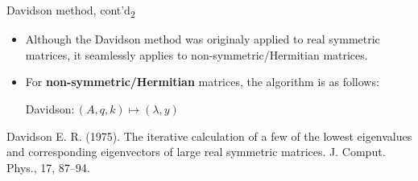 \documentclass[t,usepdftitle=false]{beamer}
\begin{document}
\begin{frame}{Davidson method, cont'd\textsubscript{2}}
\begin{itemize}
\item Although the Davidson method was originaly applied to real symmetric matrices, it seamlessly applies to non-symmetric/Hermitian matrices.
\item[] For \textbf{non-symmetric/Hermitian} matrices, the algorithm is as follows:\vspace{-.22cm}
\begin{algorithm}[H]
\small
\caption{Davidson$:(A,q,k)\mapsto (\lambda,y)$}
\begin{algorithmic}[1]
\ENDFOR
\end{algorithmic}
\end{algorithm}	
\end{itemize}\vspace{-.22cm}
\tiny{Davidson E. R. (1975). The iterative calculation of a few of the lowest eigenvalues and corresponding eigenvectors of large real symmetric matrices. J. Comput. Phys., 17, 87–94.}
\end{frame}
\end{document}

